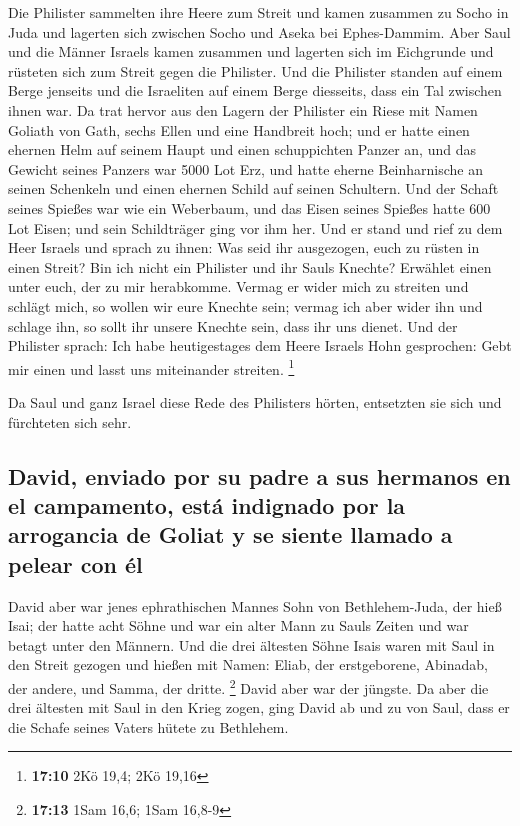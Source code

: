  Die Philister sammelten ihre Heere zum Streit und kamen
zusammen zu Socho in Juda und lagerten sich zwischen Socho und Aseka bei
Ephes-Dammim.  Aber Saul und die Männer Israels kamen
zusammen und lagerten sich im Eichgrunde und rüsteten sich zum Streit
gegen die Philister.  Und die Philister standen auf einem
Berge jenseits und die Israeliten auf einem Berge diesseits, dass ein
Tal zwischen ihnen war.  Da trat hervor aus den Lagern der
Philister ein Riese mit Namen Goliath von Gath, sechs Ellen und eine
Handbreit hoch;  und er hatte einen ehernen Helm auf
seinem Haupt und einen schuppichten Panzer an, und das Gewicht seines
Panzers war 5000 Lot Erz,  und hatte eherne Beinharnische
an seinen Schenkeln und einen ehernen Schild auf seinen Schultern.
 Und der Schaft seines Spießes war wie ein Weberbaum, und
das Eisen seines Spießes hatte 600 Lot Eisen; und sein Schildträger ging
vor ihm her.  Und er stand und rief zu dem Heer Israels
und sprach zu ihnen: Was seid ihr ausgezogen, euch zu rüsten in einen
Streit? Bin ich nicht ein Philister und ihr Sauls Knechte? Erwählet
einen unter euch, der zu mir herabkomme.  Vermag er wider
mich zu streiten und schlägt mich, so wollen wir eure Knechte sein;
vermag ich aber wider ihn und schlage ihn, so sollt ihr unsere Knechte
sein, dass ihr uns dienet.  Und der Philister sprach: Ich
habe heutigestages dem Heere Israels Hohn gesprochen: Gebt mir einen und
lasst uns miteinander streiten. \footnote{\textbf{17:10} 2Kö 19,4; 2Kö
  19,16}

 Da Saul und ganz Israel diese Rede des Philisters
hörten, entsetzten sie sich und fürchteten sich sehr.

\hypertarget{david-enviado-por-su-padre-a-sus-hermanos-en-el-campamento-estuxe1-indignado-por-la-arrogancia-de-goliat-y-se-siente-llamado-a-pelear-con-uxe9l}{%
\subsection{David, enviado por su padre a sus hermanos en el campamento,
está indignado por la arrogancia de Goliat y se siente llamado a pelear
con
él}\label{david-enviado-por-su-padre-a-sus-hermanos-en-el-campamento-estuxe1-indignado-por-la-arrogancia-de-goliat-y-se-siente-llamado-a-pelear-con-uxe9l}}

 David aber war jenes ephrathischen Mannes Sohn von
Bethlehem-Juda, der hieß Isai; der hatte acht Söhne und war ein alter
Mann zu Sauls Zeiten und war betagt unter den Männern. 
Und die drei ältesten Söhne Isais waren mit Saul in den Streit gezogen
und hießen mit Namen: Eliab, der erstgeborene, Abinadab, der andere, und
Samma, der dritte. \footnote{\textbf{17:13} 1Sam 16,6; 1Sam 16,8-9}
 David aber war der jüngste. Da aber die drei ältesten
mit Saul in den Krieg zogen,  ging David ab und zu von
Saul, dass er die Schafe seines Vaters hütete zu Bethlehem.

